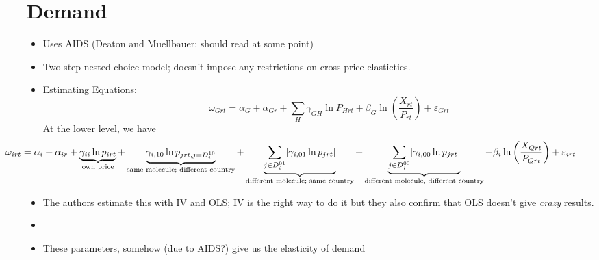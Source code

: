 


\section{Demand}
\begin{itemize}
\item Uses AIDS (Deaton and Muellbauer; should read at some point)
\item Two-step nested choice model; doesn't impose any restrictions on cross-price elasticties.
\item Estimating Equations:
  \begin{equation}
    \omega_{Grt} = \alpha_G + \alpha_{Gr} + \sum_H \gamma_{GH} \ln P_{Hrt} + \beta_G \ln \left(\frac{X_{rt}}{P_{rt}}\right) + \varepsilon_{Grt} \tag{Upper Stage}
  \end{equation}
  At the lower level, we have
  \begin{equation*}
  \hspace{-8em}  \omega_{irt} = \alpha_i + \alpha_{ir} + \underbrace{\gamma_{ii} \ln  p_{irt}}_{\text{own price}} + \underbrace{\gamma_{i, 10} \ln p_{jrt, j = D_i^{10}}}_{\text{same molecule; different country}} + \underbrace{\sum_{j \in D_i^{01}}[\gamma_{i, 01} \ln p_{jrt}]}_{\text{different molecule; same country}} + \underbrace{\sum_{j \in D_i^{00}}[\gamma_{i, 00} \ln p_{jrt}]}_{\text{different molecule, different country}} + \beta_i \ln \left(\frac{X_{Qrt}}{P_{Qrt}}\right) + \varepsilon_{irt} %
  \end{equation*}
\item The authors estimate this with IV and OLS; IV is the right way to do it but they also confirm that OLS doesn't give \emph{crazy} results.
\item {}
  \item These parameters, somehow (due to AIDS?) give us the elasticity of demand 
\end{itemize}

